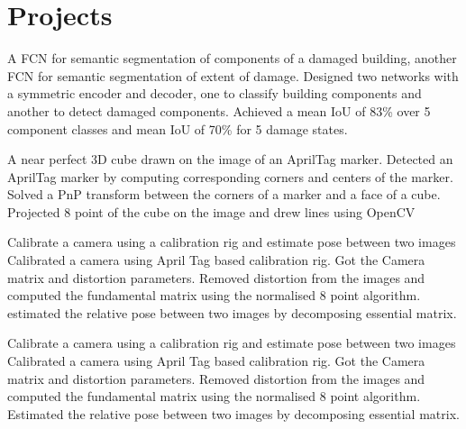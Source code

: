 \section{Projects}
\resumeSubHeadingListStart

\resumeItemListStart
{}
{A FCN for semantic segmentation of components of a damaged building, another FCN for semantic segmentation of extent of damage.}
{Designed two networks with a symmetric encoder and decoder, one to classify building components and another to detect damaged components.}
{Achieved a mean IoU of 83\% over 5 component classes and mean IoU of 70\% for 5 damage states.}
\resumeItemListEnd

\resumeItemListStart
{}
{A near perfect 3D cube drawn on the image of an AprilTag marker.}
{Detected an AprilTag marker by computing corresponding corners and centers of the marker.}
{Solved a PnP transform between the corners of a marker and a face of a cube.}
{Projected 8 point of the cube on the image and drew lines using OpenCV}
\resumeItemListEnd

\resumeItemListStart
{}
{Calibrate a camera using a calibration rig and estimate pose between two images}
{Calibrated a camera using April Tag based calibration rig. Got the Camera matrix and distortion parameters.}
{Removed distortion from the images and computed the fundamental matrix using the normalised 8 point algorithm.}
{estimated the relative pose between two images by decomposing essential matrix.}
\resumeItemListEnd

\resumeItemListStart
{}
{Calibrate a camera using a calibration rig and estimate pose between two images}
{Calibrated a camera using April Tag based calibration rig. Got the Camera matrix and distortion parameters.}
{Removed distortion from the images and computed the fundamental matrix using the normalised 8 point algorithm.}
{Estimated the relative pose between two images by decomposing essential matrix.}
\resumeItemListEnd

